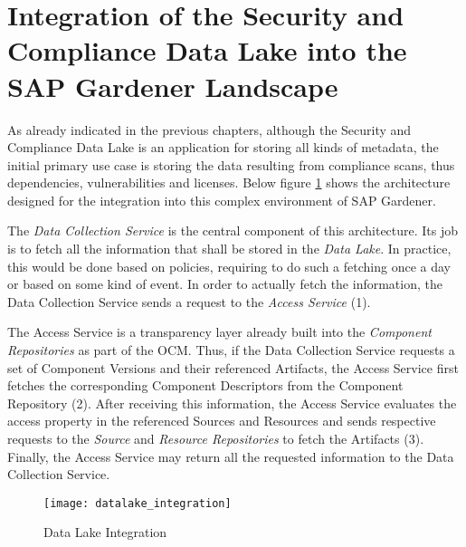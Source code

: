 \section{Integration of the Security and Compliance Data Lake into the SAP Gardener Landscape}
As already indicated in the previous chapters, although the Security and Compliance Data Lake is an application for storing all kinds of metadata, the initial primary use case is storing the data resulting from compliance scans, thus dependencies, vulnerabilities and licenses. Below figure \ref{fig:DataLakeIntegration} shows the architecture designed for the integration into this complex environment of SAP Gardener.\par 
The \emph{Data Collection Service} is the central component of this architecture. Its job is to fetch all the information that shall be stored in the \emph{Data Lake}. In practice, this would be done based on policies, requiring to do such a fetching once a day or based on some kind of event. In order to actually fetch the information, the Data Collection Service sends a request to the \emph{Access Service} (1).\par
The Access Service is a transparency layer already built into the \emph{Component Repositories} as part of the OCM. Thus, if the Data Collection Service requests a set of Component Versions and their referenced Artifacts, the Access Service first fetches the corresponding Component Descriptors from the Component Repository (2). After receiving this information, the Access Service evaluates the access property in the referenced Sources and Resources and sends respective requests to the \emph{Source} and \emph{Resource Repositories} to fetch the Artifacts (3). Finally, the Access Service may return all the requested information to the Data Collection Service.\par

\begin{figure}[H]
	\centering
	\texttt{[image: datalake\_integration]}
	\caption[Data Lake Integration]{Data Lake Integration }
	\label{fig:DataLakeIntegration}
\end{figure}

